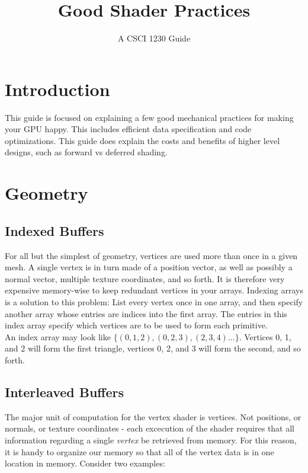 \documentclass{scrartcl}
\begin{document}
\title{Good Shader Practices}
\subtitle{A CSCI 1230 Guide}
\author{}
\date{}

\maketitle

\tableofcontents

\section{Introduction}

This guide is focused on explaining a few good mechanical practices for making your GPU happy. This includes efficient data specification and code optimizations. This guide does  explain the costs and benefits of higher level designs, such as forward vs deferred shading.

\section{ Geometry }

\subsection{ Indexed Buffers }

For all but the simplest of geometry, vertices are used more than once in a given mesh. A single vertex is in turn made of a position vector, as well as possibly a normal vector, multiple texture coordinates, and so forth. It is therefore very expensive memory-wise to keep redundant vertices in your arrays. Indexing arrays is a solution to this problem: List every vertex once in one array, and then specify another array whose entries are indices into the first array. The entries in this index array specify which vertices are to be used to form each primitive.\\

An index array may look like $\{ (0, 1, 2 ), (0, 2, 3), (2, 3, 4) \ldots \}$. Vertices 0, 1, and 2 will form the first triangle, vertices 0, 2, and 3 will form the second, and so forth.

\subsection{ Interleaved Buffers }

The major unit of computation for the vertex shader is vertices. Not positions, or normals, or texture coordinates - each excecution of the shader requires that all information regarding a single \textit{vertex} be retrieved from memory. For this reason, it is handy to organize our memory so that all of the vertex data is in one location in memory. Consider two examples:
\end{document}
